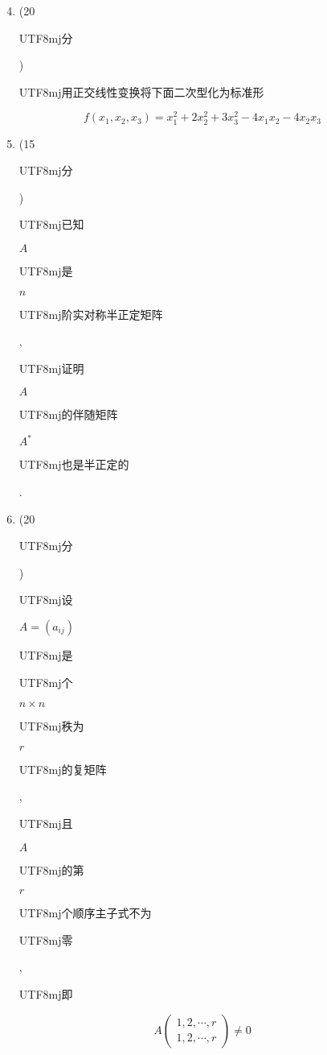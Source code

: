 \documentclass[10pt]{article}
\begin{document}
\begin{enumerate}
  \setcounter{enumi}{3}
  \item (20 \begin{CJK}{UTF8}{mj}分\end{CJK}) \begin{CJK}{UTF8}{mj}用正交线性变换将下面二次型化为标准形\end{CJK}
\end{enumerate}
$$
f\left(x_{1}, x_{2}, x_{3}\right)=x_{1}^{2}+2 x_{2}^{2}+3 x_{3}^{2}-4 x_{1} x_{2}-4 x_{2} x_{3}
$$

\begin{enumerate}
  \setcounter{enumi}{4}
  \item (15 \begin{CJK}{UTF8}{mj}分\end{CJK}) \begin{CJK}{UTF8}{mj}已知\end{CJK} $A$ \begin{CJK}{UTF8}{mj}是\end{CJK} $n$ \begin{CJK}{UTF8}{mj}阶实对称半正定矩阵\end{CJK}, \begin{CJK}{UTF8}{mj}证明\end{CJK} $A$ \begin{CJK}{UTF8}{mj}的伴随矩阵\end{CJK} $A^{*}$ \begin{CJK}{UTF8}{mj}也是半正定的\end{CJK}.

  \item (20 \begin{CJK}{UTF8}{mj}分\end{CJK}) \begin{CJK}{UTF8}{mj}设\end{CJK} $A=\left(a_{i j}\right)$ \begin{CJK}{UTF8}{mj}是\end{CJK} \begin{CJK}{UTF8}{mj}个\end{CJK} $n \times n$ \begin{CJK}{UTF8}{mj}秩为\end{CJK} $r$ \begin{CJK}{UTF8}{mj}的复矩阵\end{CJK}, \begin{CJK}{UTF8}{mj}且\end{CJK} $A$ \begin{CJK}{UTF8}{mj}的第\end{CJK} $r$ \begin{CJK}{UTF8}{mj}个顺序主子式不为\end{CJK} \begin{CJK}{UTF8}{mj}零\end{CJK}, \begin{CJK}{UTF8}{mj}即\end{CJK}

\end{enumerate}
$$
A\left(\begin{array}{c}
1,2, \cdots, r \\
1,2, \cdots, r
\end{array}\right) \neq 0
$$
\end{document}
